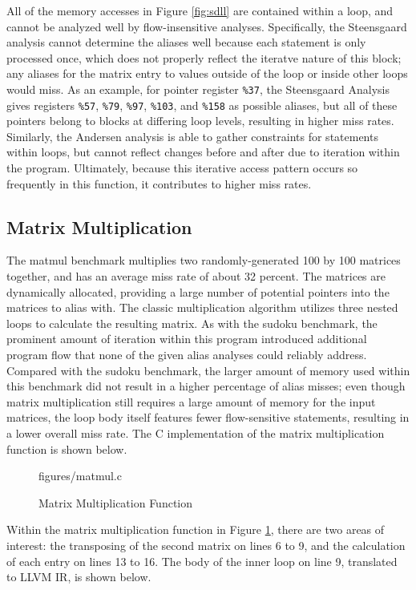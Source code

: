 All of the memory accesses in Figure \ref{fig:sdll} are contained within a loop, and cannot be analyzed well by flow-insensitive analyses. Specifically, the Steensgaard analysis cannot determine the aliases well because each statement is only processed once, which does not properly reflect the iteratve nature of this block; any aliases for the matrix entry to values outside of the loop or inside other loops would miss. As an example, for pointer register \texttt{\%37}, the Steensgaard Analysis gives registers \texttt{\%57}, \texttt{\%79}, \texttt{\%97}, \texttt{\%103}, and \texttt{\%158} as possible aliases, but all of these pointers belong to blocks at differing loop levels, resulting in higher miss rates. Similarly, the Andersen analysis is able to gather constraints for statements within loops, but cannot reflect changes before and after due to iteration within the program. Ultimately, because this iterative access pattern occurs so frequently in this function, it contributes to higher miss rates.

\subsection{Matrix Multiplication}
The matmul benchmark multiplies two randomly-generated 100 by 100 matrices together, and has an average miss rate of about 32 percent. The matrices are dynamically allocated, providing a large number of potential pointers into the matrices to alias with. The classic multiplication algorithm utilizes three nested loops to calculate the resulting matrix. As with the sudoku benchmark, the prominent amount of iteration within this program introduced additional program flow that none of the given alias analyses could reliably address. Compared with the sudoku benchmark, the larger amount of memory used within this benchmark did not result in a higher percentage of alias misses; even though matrix multiplication still requires a large amount of memory for the input matrices, the loop body itself features fewer flow-sensitive statements, resulting in a lower overall miss rate. The C implementation of the matrix multiplication function is shown below.

\begin{figure} [h]
   {figures/matmul.c}
  \caption{Matrix Multiplication Function}
  \label{fig:mmc}
\end{figure}

Within the matrix multiplication function in Figure \ref{fig:mmc}, there are two areas of interest: the transposing of the second matrix on lines 6 to 9, and the calculation of each entry on lines 13 to 16. The body of the inner loop on line 9, translated to LLVM IR, is shown below.


